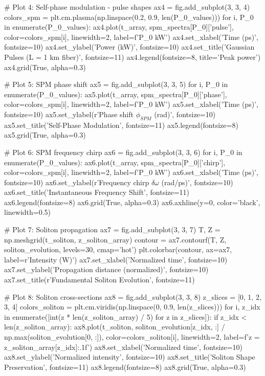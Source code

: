 \documentclass[a4paper, 11pt]{article}
\begin{document}
\begin{pycode}
# Plot 4: Self-phase modulation - pulse shapes
ax4 = fig.add_subplot(3, 3, 4)
colors_spm = plt.cm.plasma(np.linspace(0.2, 0.9, len(P_0_values)))
for i, P_0 in enumerate(P_0_values):
    ax4.plot(t_array, spm_spectra[P_0]['pulse'],
            color=colors_spm[i], linewidth=2, label=f'{P_0} kW')
ax4.set_xlabel('Time (ps)', fontsize=10)
ax4.set_ylabel('Power (kW)', fontsize=10)
ax4.set_title('Gaussian Pulses (L = 1 km fiber)', fontsize=11)
ax4.legend(fontsize=8, title='Peak power')
ax4.grid(True, alpha=0.3)

# Plot 5: SPM phase shift
ax5 = fig.add_subplot(3, 3, 5)
for i, P_0 in enumerate(P_0_values):
    ax5.plot(t_array, spm_spectra[P_0]['phase'],
            color=colors_spm[i], linewidth=2, label=f'{P_0} kW')
ax5.set_xlabel('Time (ps)', fontsize=10)
ax5.set_ylabel(r'Phase shift $\phi_{SPM}$ (rad)', fontsize=10)
ax5.set_title('Self-Phase Modulation', fontsize=11)
ax5.legend(fontsize=8)
ax5.grid(True, alpha=0.3)

# Plot 6: SPM frequency chirp
ax6 = fig.add_subplot(3, 3, 6)
for i, P_0 in enumerate(P_0_values):
    ax6.plot(t_array, spm_spectra[P_0]['chirp'],
            color=colors_spm[i], linewidth=2, label=f'{P_0} kW')
ax6.set_xlabel('Time (ps)', fontsize=10)
ax6.set_ylabel(r'Frequency chirp $\delta\omega$ (rad/ps)', fontsize=10)
ax6.set_title('Instantaneous Frequency Shift', fontsize=11)
ax6.legend(fontsize=8)
ax6.grid(True, alpha=0.3)
ax6.axhline(y=0, color='black', linewidth=0.5)

# Plot 7: Soliton propagation
ax7 = fig.add_subplot(3, 3, 7)
T, Z = np.meshgrid(t_soliton, z_soliton_array)
contour = ax7.contourf(T, Z, soliton_evolution, levels=30, cmap='hot')
plt.colorbar(contour, ax=ax7, label=r'Intensity (W)')
ax7.set_xlabel('Normalized time', fontsize=10)
ax7.set_ylabel('Propagation distance (normalized)', fontsize=10)
ax7.set_title(r'Fundamental Soliton Evolution', fontsize=11)

# Plot 8: Soliton cross-sections
ax8 = fig.add_subplot(3, 3, 8)
z_slices = [0, 1, 2, 3, 4]
colors_soliton = plt.cm.viridis(np.linspace(0, 0.9, len(z_slices)))
for i, z_idx in enumerate([int(z * len(z_soliton_array) / 5) for z in z_slices]):
    if z_idx < len(z_soliton_array):
        ax8.plot(t_soliton, soliton_evolution[z_idx, :] / np.max(soliton_evolution[0, :]),
                color=colors_soliton[i], linewidth=2,
                label=f'z = {z_soliton_array[z_idx]:.1f}')
ax8.set_xlabel('Normalized time', fontsize=10)
ax8.set_ylabel('Normalized intensity', fontsize=10)
ax8.set_title('Soliton Shape Preservation', fontsize=11)
ax8.legend(fontsize=8)
ax8.grid(True, alpha=0.3)


\end{pycode}
\end{document}
